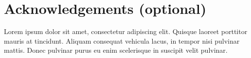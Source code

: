\documentclass[a4paper,10pt,twocolumn]{article}
\begin{document}
\section*{Acknowledgements (optional)}

Lorem ipsum dolor sit amet, consectetur adipiscing elit. Quisque laoreet porttitor mauris at tincidunt. Aliquam consequat vehicula lacus, in tempor nisi pulvinar mattis. Donec pulvinar purus eu enim scelerisque in suscipit velit pulvinar.


\end{document}
